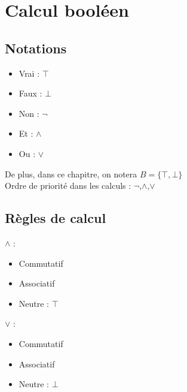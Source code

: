 
\maketitle

\section{Calcul booléen}

\subsection{Notations}

\begin{itemize}
    \item Vrai : $\top$
    \item Faux : $\bot$
    \item Non : $\lnot$
    \item Et : $\land$
    \item Ou : $\lor$
\end{itemize}
\newline

De plus, dans ce chapitre, on notera $B=\{\top,\bot\}$ \\
Ordre de priorité dans les calculs : $\lnot$,$\land$,$\lor$ \\

\subsection{Règles de calcul}

\begin{prop}
    $\land$ :
    \begin{itemize}
        \item Commutatif
        \item Associatif
        \item Neutre : $\top$
    \end{itemize}
\end{prop}

\begin{prop}
    $\lor$ :
    \begin{itemize}
        \item Commutatif
        \item Associatif
        \item Neutre : $\bot$
    \end{itemize}
\end{prop}

